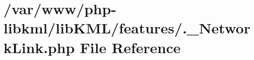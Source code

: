 \hypertarget{_8__NetworkLink_8php}{
\section{/var/www/php-\/libkml/libKML/features/.\_\-NetworkLink.php File Reference}
\label{d6/dd7/_8__NetworkLink_8php}
}
